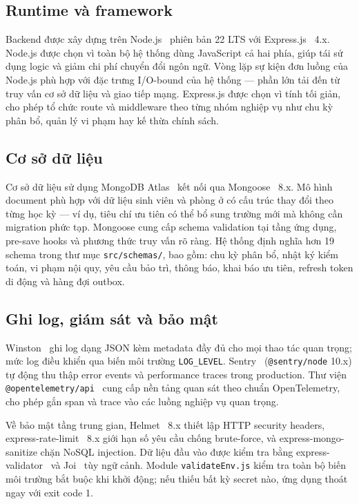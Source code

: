 \documentclass[../DoAn.tex]{subfiles}
\begin{document}
\subsection*{Runtime và framework}

Backend được xây dựng trên Node.js~\cite{nodejs_docs} phiên bản 22 LTS với
Express.js~\cite{expressjs_docs} 4.x. Node.js được chọn vì toàn bộ hệ thống
dùng JavaScript cả hai phía, giúp tái sử dụng logic và giảm chi phí chuyển đổi
ngôn ngữ. Vòng lặp sự kiện đơn luồng của Node.js phù hợp với đặc trưng
I/O-bound của hệ thống --- phần lớn tải đến từ truy vấn cơ sở dữ liệu và giao
tiếp mạng. Express.js được chọn vì tính tối giản, cho phép tổ chức route và
middleware theo từng nhóm nghiệp vụ như chu kỳ phân bổ, quản lý vi phạm hay
kế thừa chính sách.

\subsection*{Cơ sở dữ liệu}

Cơ sở dữ liệu sử dụng MongoDB Atlas~\cite{mongodb2024datamodel} kết nối qua
Mongoose~\cite{mongoose_docs} 8.x. Mô hình document phù hợp với dữ liệu sinh
viên và phòng ở có cấu trúc thay đổi theo từng học kỳ --- ví dụ, tiêu chí ưu
tiên có thể bổ sung trường mới mà không cần migration phức tạp. Mongoose cung
cấp schema validation tại tầng ứng dụng, pre-save hooks và phương thức truy
vấn rõ ràng. Hệ thống định nghĩa hơn 19 schema trong thư mục
\texttt{src/schemas/}, bao gồm: chu kỳ phân bổ, nhật ký kiểm toán, vi phạm
nội quy, yêu cầu bảo trì, thông báo, khai báo ưu tiên, refresh token di động
và hàng đợi outbox.

\subsection*{Ghi log, giám sát và bảo mật}

Winston~\cite{winston_docs} ghi log dạng JSON kèm metadata đầy đủ cho mọi thao
tác quan trọng; mức log điều khiển qua biến môi trường \texttt{LOG\_LEVEL}.
Sentry~\cite{sentry_docs} (\texttt{@sentry/node} 10.x) tự động thu thập error
events và performance traces trong production. Thư viện
\texttt{@opentelemetry/api}~\cite{opentelemetry_docs} cung cấp nền tảng quan
sát theo chuẩn OpenTelemetry, cho phép gắn span và trace vào các luồng nghiệp
vụ quan trọng.

Về bảo mật tầng trung gian, Helmet~\cite{helmet_docs} 8.x thiết lập HTTP
security headers, express-rate-limit~\cite{express_rate_limit} 8.x giới hạn
số yêu cầu chống brute-force, và express-mongo-sanitize chặn NoSQL injection.
Dữ liệu đầu vào được kiểm tra bằng express-validator~\cite{express_validator_docs}
và Joi~\cite{joi_docs} tùy ngữ cảnh. Module \texttt{validateEnv.js} kiểm tra
toàn bộ biến môi trường bắt buộc khi khởi động; nếu thiếu bất kỳ secret nào,
ứng dụng thoát ngay với exit code 1.
\end{document}
